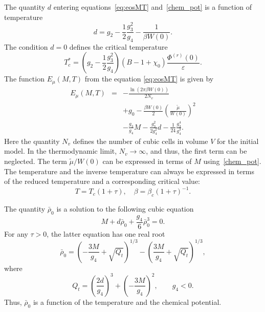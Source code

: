 The quantity $d$ entering equations~\eqref{eq:eosMT} and~\eqref{chem_pot} is a function of temperature
\begin{equation}
	\label{def:D0}
	d = g_2 - \frac{1}{2} \frac{g_3^2}{g_4} - \frac{1}{\beta W(0)}.
\end{equation}
The condition $d = 0$ defines the critical temperature~\cite{KD20}
\begin{equation}
	T^*_c = \left(g_2 - \frac{1}{2} \frac{g_3^2}{g_4} \right) (B - 1 + \chi_0) \frac{\Phi^{(r)}(0)}{\varepsilon}.
\end{equation}  
The function $E_\mu(M, T)$ from the equation \eqref{eq:eosMT} is given by
\begin{eqnarray}\label{eq:E_mu}
	E_\mu (M, T) & = & - \frac{\ln (2\pi \beta W(0))}{2 N_v}  
	\nonumber\\
	&& +  g_0 - \frac{\beta W(0)}{2} 
	\left(\frac{\tilde\mu}{W(0)} \right)^{2} 
	\nonumber\\
	&& - \frac{g_3}{g_4} {M} \! - \frac{g_3^2}{2 g_4^2}  d - \frac{1}{24} \frac{g_3^4}{g_4^3}. 
\end{eqnarray}
Here the quantity $N_v$ defines the number of cubic cells in volume $V$ for the initial model.
In the thermodynamic limit, $N_v \to \infty$, and thus, the first term can be neglected. The term $\tilde{\mu}/W(0)$ can be expressed in terms of $M$ using~\eqref{chem_pot}. The temperature and the inverse temperature can always be expressed in terms of the reduced temperature and a corresponding critical value:
\begin{equation*}
	T = T_c(1+\tau), \quad \beta = \beta_c (1 + \tau)^{-1}.
\end{equation*} 

The quantity $\bar{\rho}_0$ is a solution to the following cubic equation
\begin{equation}\label{eq:ro_M}
	M + d \bar\rho_0 + \frac{g_4}{6} \bar\rho_0^3 = 0.
\end{equation}
For any $\tau > 0$, the latter equation has one real root
\begin{equation}\label{eq:ro_MT}
	\bar \rho_0 = \left(- \frac{3 M}{g_4} + \sqrt{Q_t}\right)^{1/3} - \left(  \frac{3 M}{g_4} + \sqrt{Q_t} \right)^{1/3},
\end{equation}
where
\begin{equation}
	Q_t = \left(  \frac{2d}{g_4}\right)^3 + \left( -\frac{3 M}{g_4}\right)^2, \qquad g_4<0.
\end{equation}
Thus, $\bar{\rho}_0$ is a function of the temperature and the chemical potential.

